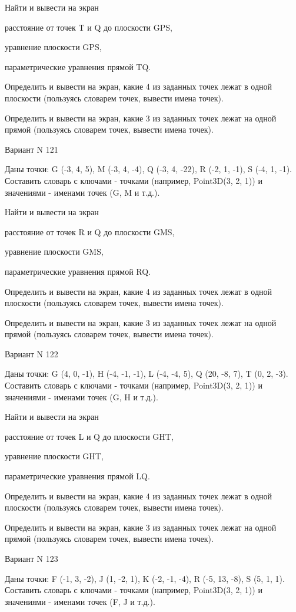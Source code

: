 \documentclass[11pt]{report}
\begin{document}
Найти и вывести на экран


расстояние от точек T и Q до плоскости GPS,


уравнение плоскости GPS,


параметрические уравнения прямой TQ.


Определить и вывести на экран, какие 4 из заданных точек лежат в одной плоскости (пользуясь словарем точек, вывести имена точек).


Определить и вывести на экран, какие 3 из заданных точек лежат на одной прямой (пользуясь словарем точек, вывести имена точек).

\newpage
Вариант N 121

Даны точки: G (-3, 4, 5), M (-3, 4, -4), Q (-3, 4, -22), R (-2, 1, -1), S (-4, 1, -1).
Составить словарь с ключами - точками (например, Point3D(3, 2, 1)) и значениями - именами точек (G, M и т.д.).


Найти и вывести на экран


расстояние от точек R и Q до плоскости GMS,


уравнение плоскости GMS,


параметрические уравнения прямой RQ.


Определить и вывести на экран, какие 4 из заданных точек лежат в одной плоскости (пользуясь словарем точек, вывести имена точек).


Определить и вывести на экран, какие 3 из заданных точек лежат на одной прямой (пользуясь словарем точек, вывести имена точек).

\newpage
Вариант N 122

Даны точки: G (4, 0, -1), H (-4, -1, -1), L (-4, -4, 5), Q (20, -8, 7), T (0, 2, -3).
Составить словарь с ключами - точками (например, Point3D(3, 2, 1)) и значениями - именами точек (G, H и т.д.).


Найти и вывести на экран


расстояние от точек L и Q до плоскости GHT,


уравнение плоскости GHT,


параметрические уравнения прямой LQ.


Определить и вывести на экран, какие 4 из заданных точек лежат в одной плоскости (пользуясь словарем точек, вывести имена точек).


Определить и вывести на экран, какие 3 из заданных точек лежат на одной прямой (пользуясь словарем точек, вывести имена точек).

\newpage
Вариант N 123

Даны точки: F (-1, 3, -2), J (1, -2, 1), K (-2, -1, -4), R (-5, 13, -8), S (5, 1, 1).
Составить словарь с ключами - точками (например, Point3D(3, 2, 1)) и значениями - именами точек (F, J и т.д.).
\end{document}
